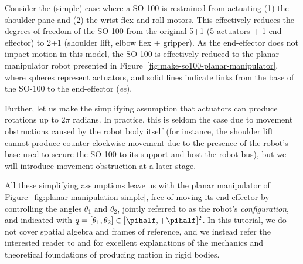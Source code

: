 Consider the (simple) case where a SO-100 is restrained from actuating (1) the shoulder pane and (2) the wrist flex and roll motors.
This effectively reduces the degrees of freedom of the SO-100 from the original 5+1 (5 actuators + 1 end-effector) to 2+1 (shoulder lift, elbow flex + gripper).
As the end-effector does not impact motion in this model, the SO-100 is effectively reduced to the planar manipulator robot presented in Figure~\ref{fig:make-so100-planar-manipulator}, where spheres represent actuators, and solid lines indicate links from the base of the SO-100 to the end-effector (\emph{ee}).

Further, let us make the simplifying assumption that actuators can produce rotations up to \( 2 \pi \) radians.
In practice, this is seldom the case due to movement obstructions caused by the robot body itself (for instance, the shoulder lift cannot produce counter-clockwise movement due to the presence of the robot's base used to secure the SO-100 to its support and host the robot bus), but we will introduce movement obstruction at a later stage.

All these simplifying assumptions leave us with the planar manipulator of Figure~\ref{fig:planar-manipulation-simple}, free of moving its end-effector by controlling the angles \( \theta_1 \) and \( \theta_2 \), jointly referred to as the robot's \emph{configuration}, and indicated with \( q = [\theta_1, \theta_2 ] \in [\pihalf, +\pihalf]^2 \).
In this tutorial, we do not cover spatial algebra and frames of reference, and we instead refer the interested reader to \citet[Chapter~2]{lynchModernRoboticsMechanics2017} and \citet[Chapter~3]{tedrakeRoboticManipulationPerception} for excellent explanations of the mechanics and theoretical foundations of producing motion in rigid bodies.

\newcommand{\panelheight}{3.2cm}  %

